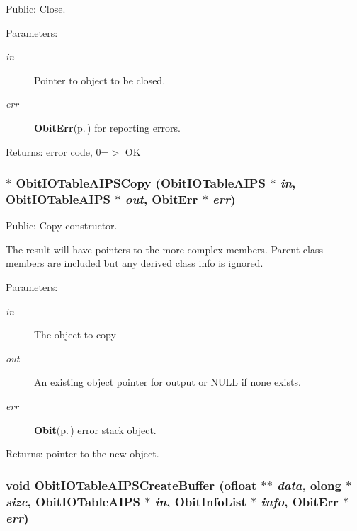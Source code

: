 Public: Close. 

\begin{Desc}
\item[Parameters:]
\begin{description}
\item[{\em in}]Pointer to object to be closed. \item[{\em err}]{\bf Obit\-Err}{\rm (p.\,\pageref{structObitErr})} for reporting errors. \end{description}
\end{Desc}
\begin{Desc}
\item[Returns:]error code, 0=$>$ OK \end{Desc}
\subsubsection{$\ast$ Obit\-IOTable\-AIPSCopy ({\bf Obit\-IOTable\-AIPS} $\ast$ {\em in}, {\bf Obit\-IOTable\-AIPS} $\ast$ {\em out}, {\bf Obit\-Err} $\ast$ {\em err})}\label{ObitIOTableAIPS_8h_a8}


Public: Copy constructor. 

The result will have pointers to the more complex members. Parent class members are included but any derived class info is ignored. \begin{Desc}
\item[Parameters:]
\begin{description}
\item[{\em in}]The object to copy \item[{\em out}]An existing object pointer for output or NULL if none exists. \item[{\em err}]{\bf Obit}{\rm (p.\,\pageref{structObit})} error stack object. \end{description}
\end{Desc}
\begin{Desc}
\item[Returns:]pointer to the new object. \end{Desc}
\subsubsection{\setlength{\rightskip}{0pt plus 5cm}void Obit\-IOTable\-AIPSCreate\-Buffer ({\bf ofloat} $\ast$$\ast$ {\em data}, {\bf olong} $\ast$ {\em size}, {\bf Obit\-IOTable\-AIPS} $\ast$ {\em in}, {\bf Obit\-Info\-List} $\ast$ {\em info}, {\bf Obit\-Err} $\ast$ {\em err})}\label{ObitIOTableAIPS_8h_a19}


